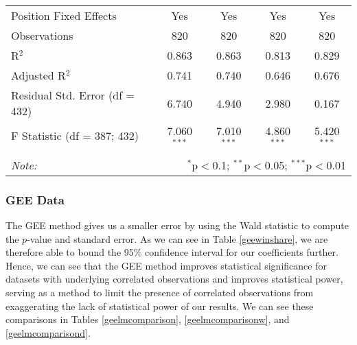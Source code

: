 \documentclass[12pt]{article}
\begin{document}
\begin{sidewaystable}[!htbp]
\begin{tabular}{@{\extracolsep{5pt}}lcccc}
			Position Fixed Effects & Yes & Yes & Yes & Yes \\ 
			Observations & 820 & 820 & 820 & 820 \\ 
			R$^{2}$ & 0.863 & 0.863 & 0.813 & 0.829 \\ 
			Adjusted R$^{2}$ & 0.741 & 0.740 & 0.646 & 0.676 \\ 
			Residual Std. Error (df = 432) & 6.740 & 4.940 & 2.980 & 0.167 \\ 
			F Statistic (df = 387; 432) & 7.060$^{***}$ & 7.010$^{***}$ & 4.860$^{***}$ & 5.420$^{***}$ \\ 
			\hline 
			\hline \\[-1.8ex] 
			\textit{Note:}  & \multicolumn{4}{r}{$^{*}$p$<$0.1; $^{**}$p$<$0.05; $^{***}$p$<$0.01} \\ 
		\end{tabular} 
	\end{sidewaystable}

	\subsubsection{GEE Data}
	
	The GEE method gives us a smaller error by using the Wald statistic to compute the $p$-value and standard error. As we can see in Table \ref{geewinshare}, we are therefore able to bound the 95\% confidence interval for our coefficients further. Hence, we can see that the GEE method improves statistical significance for datasets with underlying correlated observations and improves statistical power, serving as a method to limit the presence of correlated observations from exaggerating the lack of statistical power of our results. We can see these comparisons in Tables \ref{geelmcomparison}, \ref{geelmcomparisonw}, and \ref{geelmcomparisond}.
	
\end{document}
